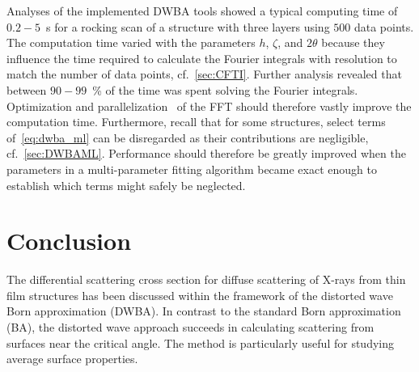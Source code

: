 \documentclass[10pt,twoside, b5paper,pdftex]{report}
\begin{document}
Analyses of the implemented DWBA tools showed a typical computing time of $0.2 - 5$~\si{\second} for a rocking scan of a  structure with three layers using $500$ data points. The computation time varied with the parameters $h$, $\zeta$, and $2\theta$ because they influence the time required to calculate the Fourier integrals with resolution to match the number of data points, cf.~\cref{sec:CFTI}. Further analysis revealed that between $90 - 99$~\si{\percent} of the time was spent solving the Fourier integrals. Optimization and parallelization~\cite{FFTW,LLOYD,MORELAND} of the FFT should therefore vastly improve the computation time. Furthermore, recall that for some structures, select terms of~\cref{eq:dwba_ml} can be disregarded as their contributions are negligible, cf.~\cref{sec:DWBAML}. Performance should therefore be greatly improved when the parameters in a multi-parameter fitting algorithm became exact enough to establish  which terms might safely  be neglected. 







\chapter{Conclusion}
The differential scattering cross section  for diffuse scattering of X-rays from thin film structures has been discussed within the framework of the distorted wave Born approximation (DWBA). In contrast to the standard Born approximation (BA), the distorted wave approach succeeds in calculating scattering from surfaces near the critical angle. The method is particularly useful for studying average surface properties. 
\end{document}
